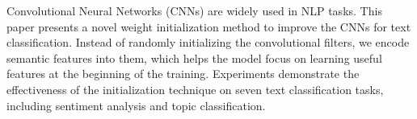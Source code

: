 Convolutional Neural Networks (CNNs) are widely used in NLP tasks. This paper presents a novel weight initialization method to improve the CNNs for text classification. Instead of randomly initializing the convolutional filters, we encode semantic features into them, which helps the model focus on learning useful features at the beginning of the training. Experiments demonstrate the effectiveness of the initialization technique on seven text classification tasks, including sentiment analysis and topic classification.
